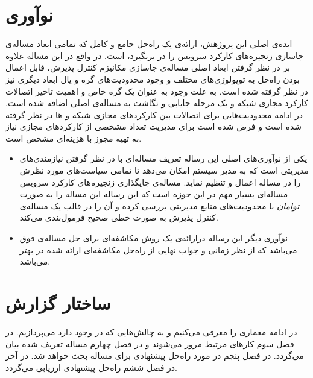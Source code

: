 \section{نوآوری}
ایده‌ی اصلی این پروژهش، ارائه‌ی یک راه‌حل جامع و کامل که تمامی ابعاد مساله‌ی جاسازی
زنجیره‌های کارکرد سرویس را در بربگیرد، است.
در واقع در این مساله علاوه بر در نظر گرفتن ابعاد اصلی مساله‌ی جاسازی مکانیزم کنترل پذیرش،
قابل اعمال بودن راه‌حل به توپولوژی‌های مختلف و وجود محدودیت‌های گره و یال ابعاد دیگری نیز در نظر گرفته شده است.
به علت وجود 
به عنوان یک گره خاص و اهمیت تاخیر اتصالات کارکرد مجازی شبکه و 
یک مرحله جایابی و نگاشت به مساله‌ی اصلی اضافه شده است.
در ادامه محدودیت‌هایی برای اتصالات بین کارکردهای مجازی شبکه و ها
در نظر گرفته شده است و فرض شده است برای مدیریت تعداد مشخصی از کارکردهای مجازی نیاز به تهیه
مجوز با هزینه‌ای مشخص است.

\begin{itemize}
    \item
    یکی از نوآوری‌های اصلی این رساله تعریف مساله‌ای با در نظر گرفتن نیازمندی‌های مدیریتی است
    که به مدیر سیستم امکان می‌دهد تا تمامی سیاست‌های مورد نظرش را در مساله اعمال و تنظیم نماید.
    مساله‌ی جایگذاری زنجیره‌های کارکرد سرویس مساله‌ای بسیار مهم در این حوزه است
    که این رساله این مساله را به صورت \emph{توامان} با محدودیت‌های منابع مدیریتی بررسی کرده و
    آن را در قالب یک مساله‌ی کنترل پذیرش به صورت خطی صحیح فرمول‌بندی می‌کند.
    \item
    نوآوری دیگر این رساله درارائه‌ی یک روش مکاشفه‌ای برای حل مساله‌ی فوق می‌باشد
    که از نظر زمانی و جواب نهایی از راه‌حل مکاشفه‌ای ارائه شده در
    \cite{Bari2015}
    بهتر می‌باشد.
\end{itemize}

\section{ساختار گزارش}
در ادامه معماری 
را معرفی می‌کنیم
و به چالش‌هایی که در  وجود دارد می‌پردازیم.
در فصل سوم کارهای مرتبط مرور می‌شوند و در فصل چهارم مساله تعریف شده بیان می‌گردد. در فصل پنجم
در مورد راه‌حل پیشنهادی برای مساله بحث خواهد شد.
در آخر در فصل ششم راه‌حل پیشنهادی ارزیابی می‌گردد.
